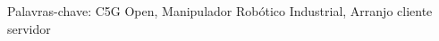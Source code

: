 \begin{abstract}
\end{abstract}

Palavras-chave: C5G Open, Manipulador Robótico Industrial, Arranjo cliente servidor

\cleardoublepage{}

